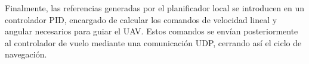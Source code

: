 Finalmente, las referencias generadas por el planificador local se introducen en un controlador PID, encargado de calcular los 
comandos de velocidad lineal y angular necesarios para guiar el UAV. Estos comandos se envían posteriormente al controlador de 
vuelo mediante una comunicación UDP, cerrando así el ciclo de navegación.
